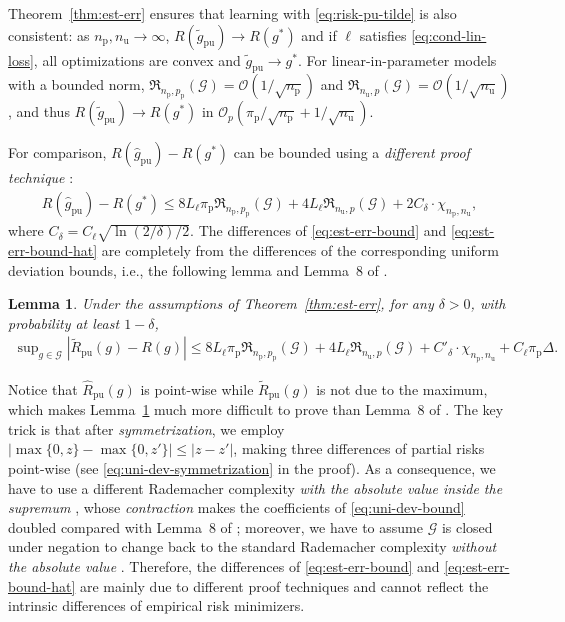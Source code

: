 \documentclass{article}
\newtheorem{lemma}[theorem]{Lemma}
\newcommand{\cG}{\mathcal{G}}
\newcommand{\cO}{\mathcal{O}}
\newcommand{\fR}{\mathfrak{R}}
\newcommand{\prp}{p_\mathrm{p}}
\newcommand{\pip}{\pi_\mathrm{p}}
\newcommand{\Np}{{n_\mathrm{p}}}
\newcommand{\Nu}{{n_\mathrm{u}}}
\newcommand{\hRpu}{\widehat{R}_\mathrm{pu}}
\newcommand{\tRpu}{\widetilde{R}_\mathrm{pu}}
\newcommand{\hgpu}{\widehat{g}_\mathrm{pu}}
\newcommand{\tgpu}{\widetilde{g}_\mathrm{pu}}
\begin{document}
Theorem~\ref{thm:est-err} ensures that learning with \eqref{eq:risk-pu-tilde} is also consistent: as $\Np,\Nu\to\infty$, $R(\tgpu)\to R(g^*)$ and if $\ell$ satisfies \eqref{eq:cond-lin-loss}, all optimizations are convex and $\tgpu\to g^*$. For linear-in-parameter models with a bounded norm, $\fR_{\Np,\prp}(\cG)=\cO(1/\sqrt{\Np})$ and $\fR_{\Nu,p}(\cG)=\cO(1/\sqrt{\Nu})$, and thus $R(\tgpu)\to R(g^*)$ in $\cO_p(\pip/\sqrt{\Np}+1/\sqrt{\Nu})$.

For comparison, $R(\hgpu)-R(g^*)$ can be bounded using a \emph{different proof technique} \citep{niu16nips}:
\begin{align}
\label{eq:est-err-bound-hat}%
R(\hgpu)-R(g^*)
\le 8L_\ell\pip\fR_{\Np,\prp}(\cG)
+4L_\ell\fR_{\Nu,p}(\cG)
+2C_\delta\cdot\chi_{\Np,\Nu},
\end{align}
where $C_\delta=C_\ell\sqrt{\ln(2/\delta)/2}$.
The differences of \eqref{eq:est-err-bound} and \eqref{eq:est-err-bound-hat} are completely from the differences of the corresponding uniform deviation bounds, i.e., the following lemma and Lemma~8 of \citep{niu16nips}.

\begin{lemma}
  \label{thm:uni-dev}%
  Under the assumptions of Theorem~\ref{thm:est-err}, for any $\delta>0$, with probability at least $1-\delta$,
  \begin{align}
  \label{eq:uni-dev-bound}%
  \sup\nolimits_{g\in\cG}|\tRpu(g)-R(g)|
  \le 8L_\ell\pip\fR_{\Np,\prp}(\cG)
  +4L_\ell\fR_{\Nu,p}(\cG)
  +C'_\delta\cdot\chi_{\Np,\Nu} +C_\ell\pip\Delta.
  \end{align}
\end{lemma}

Notice that $\hRpu(g)$ is point-wise while $\tRpu(g)$ is not due to the maximum, which makes Lemma~\ref{thm:uni-dev} much more difficult to prove than Lemma~8 of \citep{niu16nips}. The key trick is that after \emph{symmetrization}, we employ $|\max\{0,z\}-\max\{0,z'\}|\le|z-z'|$, making three differences of partial risks point-wise (see \eqref{eq:uni-dev-symmetrization} in the proof). As a consequence, we have to use a different Rademacher complexity \emph{with the absolute value inside the supremum} \citep{koltchinskii01tit,bartlett02jmlr}, whose \emph{contraction} makes the coefficients of \eqref{eq:uni-dev-bound} doubled compared with Lemma~8 of \citep{niu16nips}; moreover, we have to assume $\cG$ is closed under negation to change back to the standard Rademacher complexity \emph{without the absolute value} \citep{mohri12FML}. Therefore, the differences of \eqref{eq:est-err-bound} and \eqref{eq:est-err-bound-hat} are mainly due to different proof techniques and cannot reflect the intrinsic differences of empirical risk minimizers.
\end{document}
